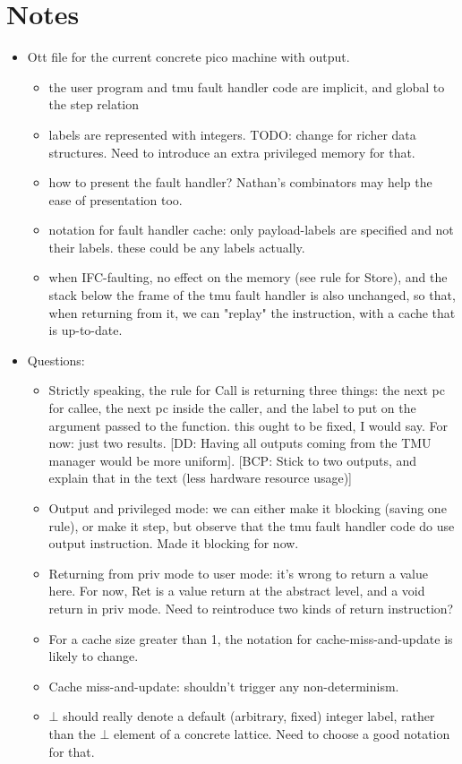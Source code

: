 \documentclass{article}
\newcommand{\comm}[3]{\textcolor{#1}{[#2: #3]}}
\newcommand{\bcp}[1]{\comm{dkred}{BCP}{#1}} %
\newcommand{\dd}[1]{\comm{dkblue}{DD}{#1}} %
\begin{document}
\section*{Notes}

\begin{itemize}
\item Ott file for the current concrete pico machine with output.
  \begin{itemize}
    \item the user program and tmu fault handler code are implicit,
      and global to the step relation
    \item labels are represented with integers. TODO: change for
      richer data structures. Need to introduce an extra privileged
      memory for that.
    \item how to present the fault handler? Nathan's
      combinators may help the ease of presentation too.
    \item notation for fault handler cache: only payload-labels are
      specified and not their labels. these could be any labels actually.
    \item when IFC-faulting, no effect on the memory (see rule for
      Store), and the stack below the frame of the tmu fault handler
      is also unchanged, so that, when returning from it, we can
      "replay" the instruction, with a cache that is up-to-date.
  \end{itemize}
\item Questions:
  \begin{itemize}
    \item Strictly speaking, the rule for Call is returning three
      things: the next pc for callee, the next pc inside the caller,
      and the label to put on the argument passed to the function.
      this ought to be fixed, I would say. For now: just two results.
      \dd{Having all outputs coming from the TMU manager would be more
        uniform}. \bcp{Stick to two outputs, and explain that in the
        text (less hardware resource usage)}
    \item Output and privileged mode: we can either make it blocking
      (saving one rule), or make it step, but observe that the tmu
      fault handler code do use output instruction. Made it blocking
      for now.
    \item Returning from priv mode to user mode: it's wrong
      to return a value here. For now, Ret is a value return at the
      abstract level, and a void return in priv mode. Need to
      reintroduce two kinds of return instruction?
    \item For a cache size greater than 1, the notation for
      cache-miss-and-update is likely to change.
    \item Cache miss-and-update: shouldn't trigger any non-determinism.
    \item $\bot$ should really denote a default (arbitrary, fixed)
      integer label, rather than the $\bot$ element of a concrete lattice.
      Need to choose a good notation for that.
  \end{itemize}
\end{itemize}
\end{document}
